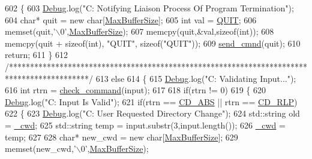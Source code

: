\begin{DoxyCode}
602       \{
603         \mbox{\hyperlink{_cli_8h_ab6d95a4e6a59b4ad033ed3af31d878e0}{Debug}}.log(\textcolor{stringliteral}{"C: Notifying Liaison Process Of Program Termination"});
604         \textcolor{keywordtype}{char}* quit = \textcolor{keyword}{new} \textcolor{keywordtype}{char}[\mbox{\hyperlink{_cli_8h_a97a33a33e5428e13cfa0eff5ba0e846f}{MaxBufferSize}}];
605         \textcolor{keywordtype}{int} val = \mbox{\hyperlink{_command_codes_8h_a3c18e64ca07cf21278f4189cd4c2732f}{QUIT}};
606         memset(quit,\textcolor{charliteral}{'\(\backslash\)0'},\mbox{\hyperlink{_cli_8h_a97a33a33e5428e13cfa0eff5ba0e846f}{MaxBufferSize}});
607         memcpy(quit,&val,\textcolor{keyword}{sizeof}(\textcolor{keywordtype}{int}));
608         memcpy(quit + \textcolor{keyword}{sizeof}(\textcolor{keywordtype}{int}), \textcolor{stringliteral}{"QUIT"}, \textcolor{keyword}{sizeof}(\textcolor{stringliteral}{"QUIT"}));
609         \mbox{\hyperlink{class_c_l_i_a1d25fcb18cf42e03a7e38c24a8ba1506}{send\_cmnd}}(quit);
610         \textcolor{keywordflow}{return};
611       \}
612       \textcolor{comment}{/*******************************************************************************************/}
613       \textcolor{keywordflow}{else}
614       \{
615         \mbox{\hyperlink{_cli_8h_ab6d95a4e6a59b4ad033ed3af31d878e0}{Debug}}.log(\textcolor{stringliteral}{"C: Validating Input..."});
616         \textcolor{keywordtype}{int} rtrn = \mbox{\hyperlink{_command_validation_8h_a3466043b5812e8ef4c469dc49bd1d7c5}{check\_command}}(input);
617 
618         \textcolor{keywordflow}{if}(rtrn != 0)
619         \{
620           \mbox{\hyperlink{_cli_8h_ab6d95a4e6a59b4ad033ed3af31d878e0}{Debug}}.log(\textcolor{stringliteral}{"C: Input Is Valid"});
621           \textcolor{keywordflow}{if}(rtrn == \mbox{\hyperlink{_command_codes_8h_ad5aa3f7b7d9b6e01c379610d421e0f02}{CD\_ABS}} || rtrn == \mbox{\hyperlink{_command_codes_8h_af392859f111f0c34f3b48bf67d871435}{CD\_RLP}})
622           \{
623             \mbox{\hyperlink{_cli_8h_ab6d95a4e6a59b4ad033ed3af31d878e0}{Debug}}.log(\textcolor{stringliteral}{"C: User Requested Directory Change"});
624             std::string old = \mbox{\hyperlink{class_c_l_i_a664097f330fa6beaad30f35eb9577ce1}{\_cwd}};
625             std::string temp = input.substr(3,input.length());
626             \mbox{\hyperlink{class_c_l_i_a664097f330fa6beaad30f35eb9577ce1}{\_cwd}} = temp;
627 
628             \textcolor{keywordtype}{char}* new\_cwd = \textcolor{keyword}{new} \textcolor{keywordtype}{char}[\mbox{\hyperlink{_cli_8h_a97a33a33e5428e13cfa0eff5ba0e846f}{MaxBufferSize}}];
629             memset(new\_cwd,\textcolor{charliteral}{'\(\backslash\)0'},\mbox{\hyperlink{_cli_8h_a97a33a33e5428e13cfa0eff5ba0e846f}{MaxBufferSize}});

\end{DoxyCode}
